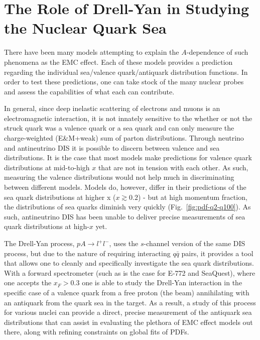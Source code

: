 \section{The Role of Drell-Yan in Studying the Nuclear Quark Sea}

There have been many models attempting to explain the $A$-dependence of such phenomena as the EMC effect. Each of these models provides a prediction regarding the individual sea/valence quark/antiquark distribution functions. In order to test these predictions, one can take stock of the many nuclear probes and assess the capabilities of what each can contribute.

In general, since deep inelastic scattering of electrons and muons is an electromagnetic interaction, it is not innately sensitive to the whether or not the struck quark was a valence quark or a sea quark and can only measure the charge-weighted (E\&M+weak) sum of parton distributions. Through neutrino and antineutrino DIS it is possible to discern between valence and sea distributions. It is the case that most models make predictions for valence quark distributions at mid-to-high $x$ that are not in tension with each other. As such, measuring the valence distributions would not help much in discriminating between different models. Models do, however, differ in their predictions of the sea quark distributions at higher x ($x\gtrsim0.2$) - but at high momentum fraction, the distributions of sea quarks diminish very quickly (Fig.~\ref{fig:pdf-q2-q100}). As such, antineutrino DIS has been unable to deliver precise measurements of sea quark distributions at high-$x$ yet.

The Drell-Yan process, $pA\rightarrow l^+l^-$, uses the $s$-channel version of the same DIS process, but due to the nature of requiring interacting $q\bar{q}$ pairs, it provides a tool that allows one to cleanly and specifically investigate the sea quark distributions. With a forward spectrometer (such as is the case for E-772 and SeaQuest), where one accepts the $x_F>0.3$ one is able to study the Drell-Yan interaction in the specific case of a valence quark from a free proton (the beam) annihilating with an antiquark from the quark sea in the target. As a result, a study of this process for various nuclei can provide a direct, precise measurement of the antiquark sea distributions that can assist in evaluating the plethora of EMC effect models out there, along with refining constraints on global fits of PDFs.

